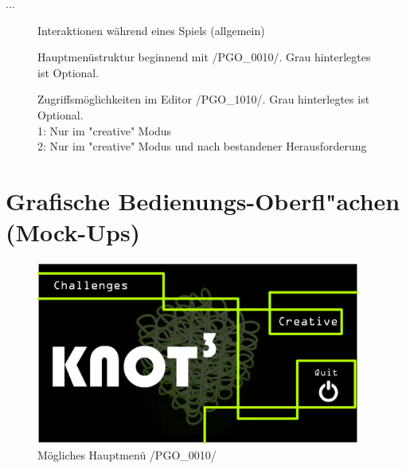 ...

\clearpage



	\begin{figure}[ht]
	  \centering
	  
	  \caption{Interaktionen während eines Spiels (allgemein)}
	\end{figure}



\begin{landscape}

	\begin{figure}[h]
		\centering
	 	
	 	\caption{Hauptmenüstruktur beginnend mit /PGO\_0010/. Grau hinterlegtes ist Optional.}
	\end{figure}
	
\end{landscape}

\clearpage

\begin{landscape}

	\begin{figure}[h]
		\centering
	 	
	 	\caption{Zugriffsmöglichkeiten im Editor /PGO\_1010/. Grau hinterlegtes ist Optional.\\\hspace{\textwidth}
			1: Nur im "creative" Modus\\\hspace{\textwidth}
			2: Nur im "creative" Modus und nach bestandener Herausforderung}
		\label{fig:ingamemenu}
	\end{figure}
	
\end{landscape}
	
\clearpage


%
%
%
\section{Grafische Bedienungs-Oberfl{"a}chen (Mock-Ups)}
	
	\begin{figure}[ht]
	  \centering
	  \includegraphics[width = 0.95\textwidth]{Inhalt/Nutzung/Grafiken/Grafische_Oberflaechen/01_Knot3-mainscreen.png}
	  \caption{Mögliches Hauptmenü /PGO\_0010/}
	  \label{fig:mainscreen}
	\end{figure}

